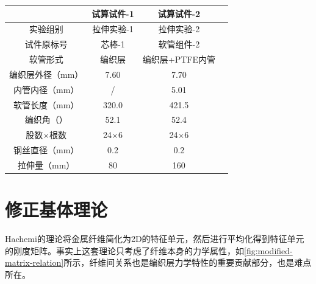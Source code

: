 \begin{table}[!htb]
	\centering
	\label{tab:characteristics-of-hose-specimen}
	\begin{tabular}{@{\extracolsep{\fill}}>{\hspace{0.5cm}}cccc}
		\toprule
		                 &   试算试件-1    &   试算试件-2    &  \\ \midrule
		实验组别             &   拉伸实验-1    &   拉伸实验-2    &  \\
		试件原标号            &    芯棒-1     &   软管组件-2    &  \\
		软管形式             & 编织层  & 编织层+PTFE内管  &  \\
		编织层外径（mm）        &    7.60     &    7.70     &  \\
		内管内径（mm）         &    /     &    5.01     &  \\
		软管长度（mm）         &    320.0    &    421.5    &  \\
		编织角（\textdegree） &    52.1     &     52.4      &  \\
		股数$\times$根数     & 24$\times$6 & 24$\times$6 &  \\
		钢丝直径（mm）         &     0.2     &     0.2     &  \\
		拉伸量（mm）         &     80     &     160    &  \\
		 \bottomrule
	\end{tabular} 
\end{table}  

\newcommand{\shi}{试算试件-1}
\newcommand{\shii}{试算试件-2}


\section{修正基体理论}

Hachemi的理论将金属纤维简化为2D的特征单元，然后进行平均化得到特征单元的刚度矩阵。事实上这套理论只考虑了纤维本身的力学属性，如\ref{fig:modified-matrix-relation}所示，纤维间关系也是编织层力学特性的重要贡献部分，也是难点所在。


